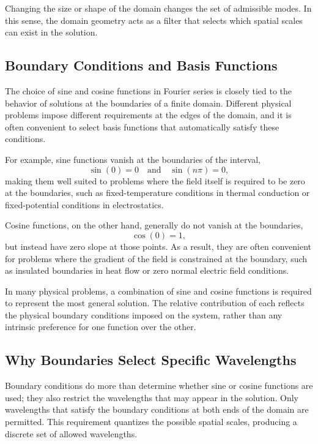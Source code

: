 Changing the size or shape of the domain changes the set of admissible modes. In this sense, the domain geometry acts as a filter that selects which spatial scales can exist in the solution.

\subsection{Boundary Conditions and Basis Functions}

The choice of sine and cosine functions in Fourier series is closely tied to the behavior of solutions at the boundaries of a finite domain. Different physical problems impose different requirements at the edges of the domain, and it is often convenient to select basis functions that automatically satisfy these conditions.

For example, sine functions vanish at the boundaries of the interval,
\begin{equation}
    \sin(0) = 0 \quad \text{and} \quad \sin(n\pi) = 0,
\end{equation}
making them well suited to problems where the field itself is required to be zero at the boundaries, such as fixed-temperature conditions in thermal conduction or fixed-potential conditions in electrostatics.

Cosine functions, on the other hand, generally do not vanish at the boundaries,
\begin{equation}
    \cos(0) = 1,
\end{equation}
but instead have zero slope at those points. As a result, they are often convenient for problems where the gradient of the field is constrained at the boundary, such as insulated boundaries in heat flow or zero normal electric field conditions.

In many physical problems, a combination of sine and cosine functions is required to represent the most general solution. The relative contribution of each reflects the physical boundary conditions imposed on the system, rather than any intrinsic preference for one function over the other.

\subsection{Why Boundaries Select Specific Wavelengths}

Boundary conditions do more than determine whether sine or cosine functions are used; they also restrict the wavelengths that may appear in the solution. Only wavelengths that satisfy the boundary conditions at both ends of the domain are permitted. This requirement quantizes the possible spatial scales, producing a discrete set of allowed wavelengths.

